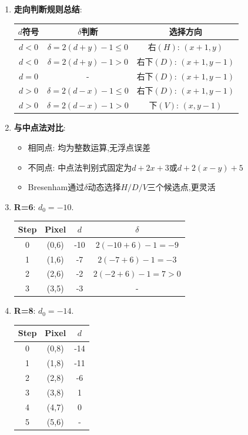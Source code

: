 \documentclass[UTF8]{ctexart}
\begin{document}
\begin{enumerate}
    \item \textbf{走向判断规则总结}:
    \begin{center}
    \begin{tabular}{ccc}
    \toprule $d$符号 & $\delta$判断 & 选择方向 \\ \midrule
    $d<0$ & $\delta=2(d+y)-1 \le 0$ & 右$(H)$: $(x+1,y)$ \\
    $d<0$ & $\delta=2(d+y)-1 > 0$ & 右下$(D)$: $(x+1,y-1)$ \\
    $d=0$ & - & 右下$(D)$: $(x+1,y-1)$ \\
    $d>0$ & $\delta=2(d-x)-1 \le 0$ & 右下$(D)$: $(x+1,y-1)$ \\
    $d>0$ & $\delta=2(d-x)-1 > 0$ & 下$(V)$: $(x,y-1)$ \\ \bottomrule
    \end{tabular}
    \end{center}
    
    \item \textbf{与中点法对比}:
    \begin{itemize}
        \item 相同点: 均为整数运算,无浮点误差
        \item 不同点: 中点法判别式固定为$d+2x+3$或$d+2(x-y)+5$
        \item Bresenham通过$\delta$动态选择$H/D/V$三个候选点,更灵活
    \end{itemize}
    
    \item \textbf{R=6}: $d_0=-10$.
    \begin{center}
    \begin{tabular}{cccc}
    \toprule Step & Pixel & $d$ & $\delta$ \\ \midrule
    0 & (0,6) & -10 & $2(-10+6)-1=-9$ \\
    1 & (1,6) & -7 & $2(-7+6)-1=-3$ \\
    2 & (2,6) & -2 & $2(-2+6)-1=7>0$ \\
    3 & (3,5) & -3 & - \\ \bottomrule
    \end{tabular}
    \end{center}
    
    \item \textbf{R=8}: $d_0=-14$.
    \begin{center}
    \begin{tabular}{ccc}
    \toprule Step & Pixel & $d$ \\ \midrule
    0 & (0,8) & -14 \\
    1 & (1,8) & -11 \\
    2 & (2,8) & -6 \\
    3 & (3,8) & 1 \\
    4 & (4,7) & 0 \\
    5 & (5,6) & - \\ \bottomrule
    \end{tabular}
    \end{center}
    

\end{enumerate}
\end{document}
